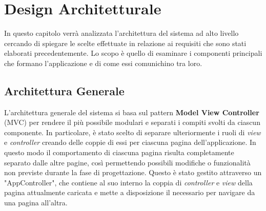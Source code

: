 

\chapter{Design Architetturale}
    In questo capitolo verrà analizzata l'architettura del sistema ad alto livello cercando di spiegare le scelte effettuate in relazione ai requisiti che sono stati elaborati precedentemente. Lo scopo è quello di esaminare i componenti principali che formano l'applicazione e di come essi comunichino tra loro.

    \section{Architettura Generale}
    L'architettura generale del sistema si basa sul pattern \textbf{Model View Controller} (MVC) per rendere il più possibile modulari e separati i compiti svolti da ciascun componente. In particolare, è stato scelto di separare ulteriormente i ruoli di \textit{view} e \textit{controller} creando delle coppie di essi per ciascuna pagina dell'applicazione. In questo modo il comportamento di ciascuna pagina risulta completamente separato dalle altre pagine, così permettendo possibili modifiche o funzionalità non previste durante la fase di progettazione. Questo è stato gestito attraverso un "AppController", che contiene al suo interno la coppia di \textit{controller} e \textit{view} della pagina attualmente caricata e mette a disposizione il necessario per navigare da una pagina all'altra.
    
